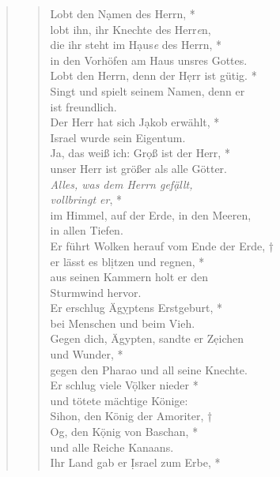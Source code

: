 



\begin{quote}
\begin{verse}

\smallskip

Lobt den N\d amen des Herrn, *\\ 
lobt ihn, ihr Knechte des Herr\textit{e}n, \\ \vin
die ihr steht im H\d aus\textit{e} des Herrn, *\\ \vin 
in den Vorhöfen am Haus unsres Gottes.\\ 
Lobt den Herrn, denn der H\d err ist gütig.  *\\ 
Singt und spielt seinem Namen, denn er \\ist freundlich.\\ \vin 
Der Herr hat sich J\d akob erwählt, *\\ \vin 
Israel wurde sein Eigentum.\\  
Ja, das weiß ich: Gr\d oß ist der Herr, *\\ 
unser Herr ist größer als alle Götter.\\ \vin  
\textit{Alles, was dem Herrn gef\d ällt,\\ \vin vollbringt er}, *\\ \vin 
im Himmel, auf der Erde, in den Meeren,\\ \vin  in allen Tiefen.\\  
Er führt Wolken herauf vom Ende der Erde, †\\ 
er lässt es bl\d itzen und regnen, *\\  aus seinen Kammern holt er den \\Sturmwind hervor.\\ \vin  
Er erschlug Äg\d yptens Erstgeburt, *\\ \vin 
bei Menschen und beim Vieh.\\  
Gegen dich, Ägypten, sandte er Z\d eichen\\ und Wunder, *\\ 
gegen den Pharao und all seine Knechte.\\ \vin 
Er schlug viele V\d ölker nieder *\\ \vin 
und tötete mächtige Könige: \\
Sihon, den König der Amoriter, †\\   
Og, den K\d önig von Baschan, *\\  und alle Reiche Kanaans.\\ 
\vin Ihr Land gab er \d Israel zum Erbe, *\\ 

\end{verse}
\end{quote}

